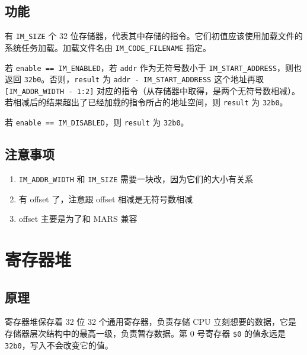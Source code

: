 \documentclass[12pt,AutoFakeBold]{article}
\providecommand{\tightlist}{%
  \setlength{\itemsep}{0pt}\setlength{\parskip}{0pt}}
\begin{document}
\hypertarget{ux529fux80fd-3}{%
\subsection{功能}\label{ux529fux80fd-3}}

有 \texttt{IM\_SIZE} 个 32
位存储器，代表其中存储的指令。它们初值应该使用加载文件的系统任务加载。加载文件名由
\texttt{IM\_CODE\_FILENAME} 指定。

若 \texttt{enable\ ==\ IM\_ENABLED}，若 \texttt{addr} 作为无符号数小于
\texttt{IM\_START\_ADDRESS}，则也返回
\texttt{32\textquotesingle{}b0}。否则，\texttt{result} 为
\texttt{addr\ -\ IM\_START\_ADDRESS} 这个地址再取
\texttt{{[}IM\_ADDR\_WIDTH\ -\ 1:2{]}}
对应的指令（从存储器中取得，是两个无符号数相减）。若相减后的结果超出了已经加载的指令所占的地址空间，则
\texttt{result} 为 \texttt{32\textquotesingle{}b0}。

若 \texttt{enable\ ==\ IM\_DISABLED}，则 \texttt{result} 为
\texttt{32\textquotesingle{}b0}。

\hypertarget{ux6ce8ux610fux4e8bux9879-2}{%
\subsection{注意事项}\label{ux6ce8ux610fux4e8bux9879-2}}

\begin{enumerate}
\def\labelenumi{\arabic{enumi}.}
\tightlist
\item
  \texttt{IM\_ADDR\_WIDTH} 和 \texttt{IM\_SIZE}
  需要一块改，因为它们的大小有关系
\item
  有 offset 了，注意跟 offset 相减是无符号数相减
\item
  offset 主要是为了和 MARS 兼容
\end{enumerate}

\hypertarget{ux5bc4ux5b58ux5668ux5806}{%
\section{寄存器堆}\label{ux5bc4ux5b58ux5668ux5806}}

\hypertarget{ux539fux7406-2}{%
\subsection{原理}\label{ux539fux7406-2}}

寄存器堆保存着 32 位 32 个通用寄存器，负责存储 CPU
立刻想要的数据，它是存储器层次结构中的最高一级，负责暂存数据。第 0
号寄存器 \texttt{\$0} 的值永远是
\texttt{32\textquotesingle{}b0}，写入不会改变它的值。
\end{document}
